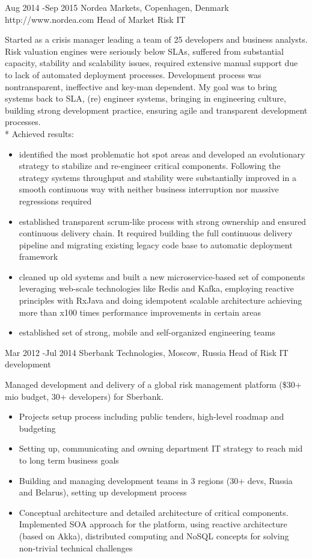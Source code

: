\documentclass[10pt]{article} %
\begin{document}

\job
{Aug 2014 -}{Sep 2015}
{Nordea Markets, Copenhagen, Denmark}
{http://www.nordea.com}
{Head of Market Risk IT}
{Started as a crisis manager leading a team of 25 developers and business analysts.
Risk valuation engines were seriously below SLAs, suffered from substantial capacity, stability and scalability issues, required extensive manual support due to lack of automated deployment processes. Development process was nontransparent, ineffective and key-man dependent.
My goal was to bring systems back to SLA, (re) engineer  systems, bringing in
engineering culture, building strong development practice, ensuring agile and transparent development
processes.\\*
Achieved results:
\begin{itemize}
\item{identified the most problematic hot spot areas and developed an evolutionary strategy to stabilize and re-engineer critical
components. Following the strategy systems throughput and stability were substantially improved
in a smooth continuous way with neither business interruption nor massive regressions required}
\item{established transparent scrum-like process with strong ownership and ensured continuous delivery chain.
It required building the full continuous delivery pipeline and migrating existing legacy code base to
automatic deployment framework}
\item{cleaned up old systems and built a new microservice-based set of components leveraging web-scale
technologies like Redis and Kafka, employing reactive principles with RxJava and doing idempotent scalable
architecture achieving more than x100 times performance improvements in certain areas}
\item{established set of strong, mobile and self-organized engineering teams}
\end{itemize}
}

\job
{Mar 2012 -}{Jul 2014}
{Sberbank Technologies, Moscow, Russia}
{}
{Head of Risk IT development}
{Managed development and delivery of a global risk management platform (\$30+ mio budget, 30+ developers) for Sberbank.
\begin{itemize}
\item{Projects setup process including public tenders, high-level roadmap and budgeting}
\item{Setting up, communicating and owning department IT strategy to reach mid to long term business goals}
\item{Building and managing development teams in 3 regions (30+ devs, Russia and Belarus), setting up development process}
\item{Conceptual architecture and detailed architecture of critical components. Implemented SOA approach for
the platform, using reactive architecture (based on Akka), distributed computing and NoSQL concepts for solving non-trivial technical
challenges}
\end{itemize}
}
\end{document}
